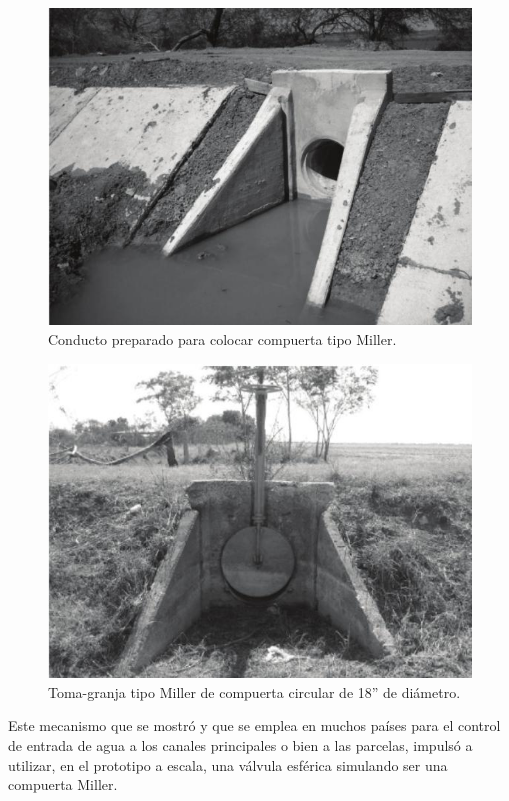 \begin{figure}[h]
\centering
\includegraphics[scale=.58]{./Figures/ConductoPreparadoParaCompuertaMiller.jpeg}
\caption{Conducto preparado para colocar compuerta tipo Miller.}
\label{fig:Conducto preparado para colocar compuerta tipo miller.}
\end{figure}


\begin{figure}[htpb]
\centering
\includegraphics[scale=.65]{./Figures/compuertamillercircular.jpeg}
\caption{Toma-granja tipo Miller de compuerta circular de 18” de diámetro.}
\label{fig:Toma granja tipo miller de compuerta circular.}
\end{figure}

Este mecanismo que se mostró y que se emplea en muchos países para el control de entrada de agua a los canales principales o bien a las parcelas, impulsó a utilizar, en el prototipo a escala, una válvula esférica simulando ser una compuerta Miller.   

